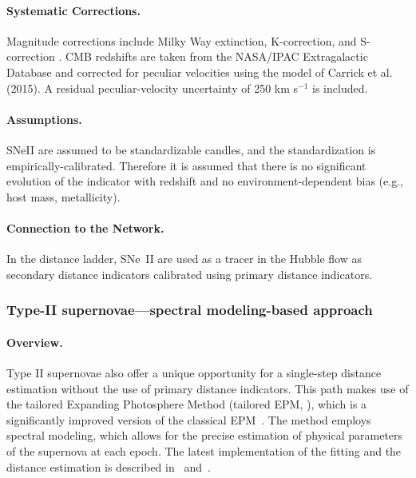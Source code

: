 \paragraph{Systematic Corrections.}
Magnitude corrections include Milky Way extinction, K-correction, and S-correction \citep{2020MNRAS.496.3402D,2022MNRAS.514.4620D}. CMB redshifts are taken from the NASA/IPAC Extragalactic Database and corrected for peculiar velocities using the model of Carrick et al. (2015). A residual peculiar-velocity uncertainty of 250 km s$^{-1}$ is included.

\paragraph{Assumptions.}
SNeII are assumed to be standardizable candles, and the standardization is empirically-calibrated. Therefore it is assumed that there is no significant evolution of the indicator with redshift and no environment-dependent bias (e.g., host mass, metallicity).

\paragraph{Connection to the Network.}
In the distance ladder, SNe~II are used as a tracer in the Hubble flow as secondary distance indicators calibrated using primary distance indicators.

 
\subsubsection{Type-II supernovae---spectral modeling-based approach}

\paragraph{Overview.}
Type II supernovae also offer a unique opportunity for a single-step distance estimation without the use of primary distance indicators. This path makes use of the tailored Expanding Photosphere Method (tailored EPM, \citealt{2005A&A...439..671D, 2020A&A...633A..88V, 2025AA...702A..41V}), which is a significantly improved version of the classical EPM~\citep{1974ApJ...193...27K, 1994ApJ...432...42S}. The method employs spectral modeling, which allows for the precise estimation of physical parameters of the supernova at each epoch. The latest implementation of the fitting and the distance estimation is described in~\citet{2025AA...702A..41V} and~\citet{2023A&A...678A..44C}.

